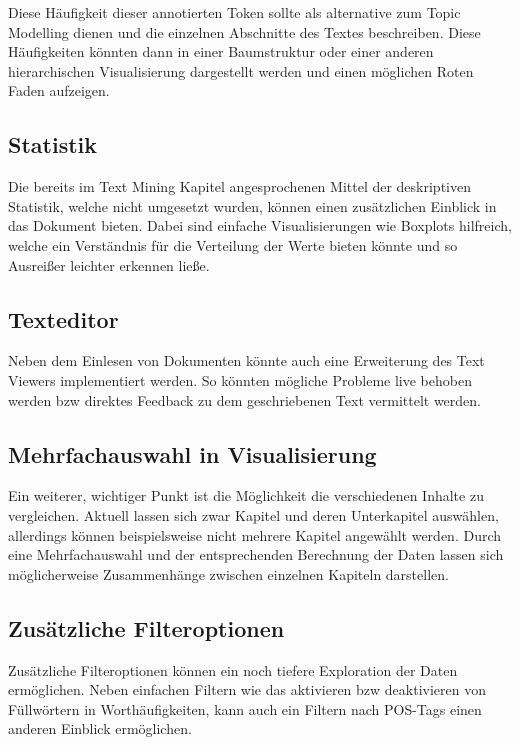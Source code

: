 Diese Häufigkeit dieser annotierten Token sollte als alternative zum Topic Modelling dienen und die einzelnen Abschnitte des Textes beschreiben. Diese Häufigkeiten könnten dann in einer Baumstruktur oder einer anderen hierarchischen Visualisierung dargestellt werden und einen möglichen Roten Faden aufzeigen.

\subsection*{Statistik}
Die bereits im Text Mining Kapitel angesprochenen Mittel der deskriptiven Statistik, welche nicht umgesetzt wurden, können einen zusätzlichen Einblick in das Dokument bieten. Dabei sind einfache Visualisierungen wie Boxplots hilfreich, welche ein Verständnis für die Verteilung der Werte bieten könnte und so Ausreißer leichter erkennen ließe.

\subsection*{Texteditor}
Neben dem Einlesen von Dokumenten könnte auch eine Erweiterung des Text Viewers implementiert werden. So könnten mögliche Probleme live behoben werden bzw direktes Feedback zu dem geschriebenen Text vermittelt werden.

\subsection{Mehrfachauswahl in Visualisierung}
Ein weiterer, wichtiger Punkt ist die Möglichkeit die verschiedenen Inhalte zu vergleichen. Aktuell lassen sich zwar Kapitel und deren Unterkapitel auswählen, allerdings können beispielsweise nicht mehrere Kapitel angewählt werden. Durch eine Mehrfachauswahl und der entsprechenden Berechnung der Daten lassen sich möglicherweise Zusammenhänge zwischen einzelnen Kapiteln darstellen.

\subsection*{Zusätzliche Filteroptionen}
Zusätzliche Filteroptionen können ein noch tiefere Exploration der Daten ermöglichen. Neben einfachen Filtern wie das aktivieren bzw deaktivieren von Füllwörtern in Worthäufigkeiten, kann auch ein Filtern nach POS-Tags einen anderen Einblick ermöglichen.